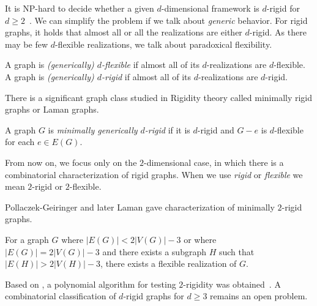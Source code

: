 It is NP-hard to decide whether a given \( d \)-dimensional framework is
\( d \)-rigid for \( d \ge 2 \)~\cite{d_rigidity_hardness}.
We can simplify the problem if we talk about \emph{generic} behavior.
%
For rigid graphs, it holds that almost all%
or all the realizations are
either \( d \)-rigid.
As there may be few \( d \)-flexible realizations,
we talk about paradoxical flexibility.
%
\begin{definition}
	A graph is \emph{(generically) \( d \)-flexible} if almost all of
	its \( d \)-realizations are \( d \)-flexible.
	A graph is \emph{(generically) \( d \)-rigid} if almost all of
	its \( d \)-realizations are \( d \)-rigid.
\end{definition}
%


There is a significant graph class studied in Rigidity theory
called minimally rigid graphs or Laman graphs.
%
\begin{definition}
	A graph \( G \) is \emph{minimally generically \( d \)-rigid} if it is \( d \)-rigid
	and \( G - e \) is \(d\)-flexible for each \( e \in E(G) \).
\end{definition}
%
From now on, we focus only on the \( 2 \)-dimensional case,
in which there is a combinatorial characterization of rigid graphs.
When we use \emph{rigid} or \emph{flexible} we mean \( 2 \)-rigid or \( 2 \)-flexible.

Pollaczek-Geiringer and later Laman gave characterization of minimally $2$-rigid graphs.
%
%
\begin{corollary}
	For a graph \( G \) where \( |E(G)| < 2|V(G)| - 3 \) or
	where \( |E(G)| = 2|V(G)| - 3 \) and there exists a subgraph \( H \) such that \( |E(H)| > 2|V(H)| - 3 \),
	there exists a flexible realization of \( G \).
\end{corollary}
%
Based on ,
a polynomial algorithm
for testing $2$-rigidity was obtained~\cite{polynomial-min-rigid}.
A combinatorial classification of $d$-rigid graphs
for $d \geq 3$ remains an open problem.

